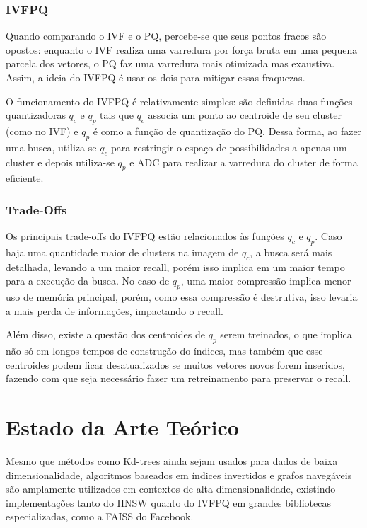 \documentclass[a4paper, 12pt]{article} %
\begin{document}
\subsubsection{IVFPQ}

Quando comparando o IVF e o PQ, percebe-se que seus pontos fracos são opostos: enquanto o IVF realiza uma varredura por força bruta em uma pequena parcela dos vetores, o PQ faz uma varredura mais otimizada mas exaustiva. Assim, a ideia do IVFPQ é usar os dois para mitigar essas fraquezas.

O funcionamento do IVFPQ é relativamente simples: são definidas duas funções quantizadoras $q_c$ e $q_p$ tais que $q_c$ associa um ponto ao centroide de seu cluster (como no IVF) e $q_p$ é como a função de quantização do PQ. Dessa forma, ao fazer uma busca, utiliza-se $q_c$ para restringir o espaço de possibilidades a apenas um cluster e depois utiliza-se $q_p$ e ADC para realizar a varredura do cluster de forma eficiente.

\subsubsection{Trade-Offs}

Os principais trade-offs do IVFPQ estão relacionados às funções $q_c$ e $q_p$. Caso haja uma quantidade maior de clusters na imagem de $q_c$, a busca será mais detalhada, levando a um maior recall, porém isso implica em um maior tempo para a execução da busca. No caso de $q_p$, uma maior compressão implica menor uso de memória principal, porém, como essa compressão é destrutiva, isso levaria a mais perda de informações, impactando o recall.

Além disso, existe a questão dos centroides de $q_p$ serem treinados, o que implica não só em longos tempos de construção do índices, mas também que esse centroides podem ficar desatualizados se muitos vetores novos forem inseridos, fazendo com que seja necessário fazer um retreinamento para preservar o recall.

\section{Estado da Arte Teórico}

Mesmo que métodos como Kd-trees ainda sejam usados para dados de baixa dimensionalidade, algoritmos baseados em índices invertidos e grafos navegáveis são amplamente utilizados em contextos de alta dimensionalidade, existindo implementações tanto do HNSW quanto do IVFPQ em grandes bibliotecas especializadas, como a FAISS do Facebook.

\nocite{*}
\printbibliography
\end{document}
